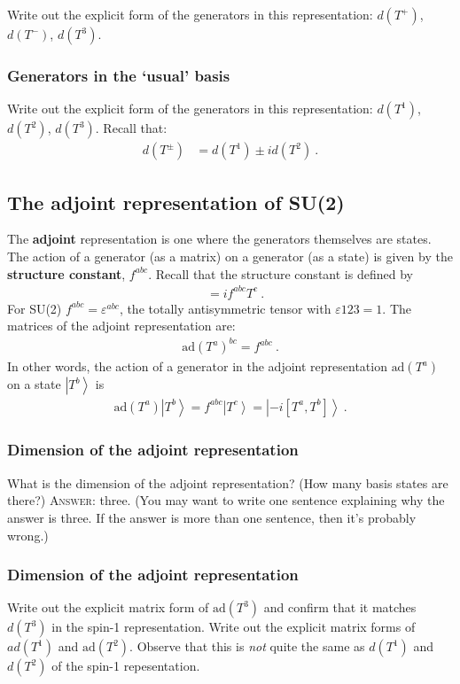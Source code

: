 \documentclass[12pt]{article}
\numberwithin{equation}{subsection}    %
\newcommand{\ket}[1]{\left|#1\right\rangle}    %
\begin{document}
Write out the explicit form of the generators in this representation: $d(T^+)$, $d(T^-)$, $d(T^3)$.

\subsubsection{Generators in the `usual' basis}

Write out the explicit form of the generators in this representation: $d(T^1)$, $d(T^2)$, $d(T^3)$. Recall that:
\begin{align}
  d(T^\pm) &= d(T^1) \pm i d(T^2) \ .
\end{align}

\subsection{The adjoint representation of SU(2)}

The \textbf{adjoint} representation is one where the generators themselves are states. The action of a generator (as a matrix) on a generator (as a state) is given by the \textbf{structure constant}, $f^{abc}$. Recall that the structure constant is defined by
\begin{align}
  [T^a, T^b] &= i f^{abc}T^c \ .
\end{align}
For SU(2) $f^{abc} = \varepsilon^{abc}$, the totally antisymmetric tensor with $\varepsilon{123} = 1$. The matrices of the adjoint representation are:
\begin{align}
  \text{ad}(T^a)^{bc} = f^{abc} \ .
\end{align}
In other words, the action of a generator in the adjoint representation $\text{ad}(T^a)$ on a state $\ket{T^b}$ is
\begin{align}
  \text{ad}(T^a)\ket{T^b} = f^{abc}\ket{T^c} = \ket{-i[T^a,T^b]} \ .
\end{align}

\subsubsection{Dimension of the adjoint representation}

What is the dimension of the adjoint representation? (How many basis states are there?) \textsc{Answer}: three. (You may want to write one sentence explaining why the answer is three. If the answer is more than one sentence, then it's probably wrong.)


\subsubsection{Dimension of the adjoint representation}
Write out the explicit matrix form of $\text{ad}(T^3)$ and confirm that it matches $d(T^3)$ in the spin-1 representation. Write out the explicit matrix forms of $ad(T^1)$ and $\text{ad}(T^2)$. Observe that this is \emph{not} quite the same as $d(T^1)$ and $d(T^2)$ of the spin-1 repesentation.
\end{document}
